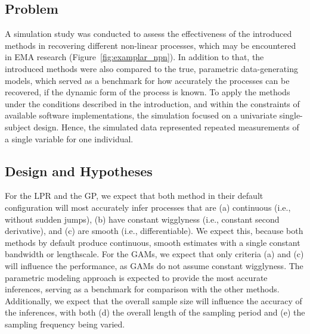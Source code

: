\documentclass[man, floatsintext]{apa7}
\begin{document}
\subsection{Problem}

A simulation study was conducted to assess the effectiveness of the introduced
methods in recovering different non-linear processes, which may be encountered
in EMA research (Figure~\ref{fig:examplar_npn}). In addition to that, the
introduced methods were also compared to the true, parametric data-generating
models, which served as a benchmark for how accurately the processes can
be recovered, if the dynamic form of the process is known.
To apply the methods under the conditions described in the introduction,
and within the constraints of available software implementations,
the simulation focused on a univariate single-subject design.
Hence, the simulated data represented repeated measurements of a single
variable for one individual.

\subsection{Design and Hypotheses}

For the LPR and the GP, we expect that
both method in their default configuration will most accurately infer processes
that are (a) continuous (i.e., without sudden jumps), (b) have constant
wigglyness (i.e., constant second derivative), and (c) are smooth (i.e.,
differentiable). We expect this, because both methods by default produce
continuous, smooth estimates with a single constant bandwidth or lengthscale.
For the GAMs, we expect that only criteria (a) and (c) will influence
the performance, as GAMs do not assume constant wigglyness. The
parametric modeling approach is expected to provide the most accurate
inferences, serving as a benchmark for comparison with the other methods.
Additionally, we expect that the overall sample size will influence the
accuracy of the inferences, with both (d) the overall length of the sampling
period and (e) the sampling frequency being varied.
\end{document}
